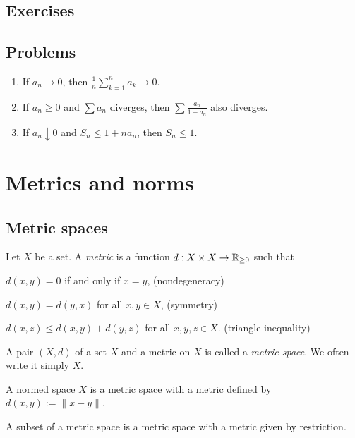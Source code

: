 \documentclass{../note}
\begin{document}
\section*{Exercises}
\begin{prb}

\end{prb}


\section*{Problems}
\begin{enumerate}
\item If $a_n\to0$, then $\frac1n\sum_{k=1}^na_k\to0$.
\item If $a_n\ge0$ and $\sum a_n$ diverges, then $\sum\frac{a_n}{1+a_n}$ also diverges.
\item If $a_n\downarrow0$ and $S_n\le1+na_n$, then $S_n\le1$.
\end{enumerate}





\chapter{Metrics and norms}
\section{Metric spaces}
\begin{prb}
Let $X$ be a set.
A \emph{metric} is a function $d:X\times X\to\mathbb{R}_{\ge0}$ such that
\begin{parts}[(i)]
\item $d(x,y)=0$ if and only if $x=y$, \hfill(nondegeneracy)
\item $d(x,y)=d(y,x)$ for all $x,y\in X$, \hfill(symmetry)
\item $d(x,z)\le d(x,y)+d(y,z)$ for all $x,y,z\in X$. \hfill(triangle inequality)
\end{parts}
A pair $(X,d)$ of a set $X$ and a metric on $X$ is called a \emph{metric space}.
We often write it simply $X$.
\begin{parts}
\item
A normed space $X$ is a metric space with a metric defined by $d(x,y):=\|x-y\|$.
\item
A subset of a metric space is a metric space with a metric given by restriction.
\end{parts}
\end{prb}
\end{document}
